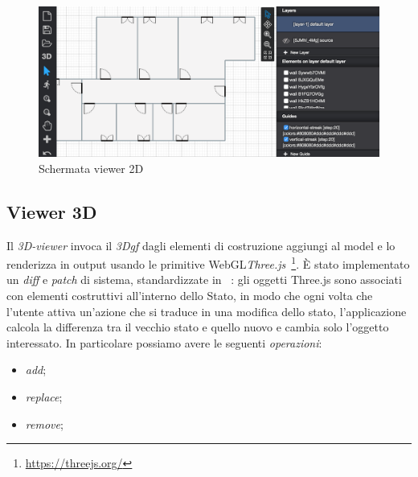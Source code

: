 
\begin{figure}[htbp] %
   \centering
   \includegraphics[width=1\linewidth]{images/2d}
   \caption{Schermata viewer 2D}
   \label{fig:view2D}
\end{figure}
\newpage


\subsection{Viewer 3D}
Il \emph{3D-viewer} invoca il \emph{3Dgf} dagli elementi di costruzione aggiungi al model e lo renderizza in output usando
le primitive WebGL\emph{Three.js}~\footnote{\url{https://threejs.org/}}. \`E stato implementato un \emph{diff} e \emph{patch} di
sistema, standardizzate in ~\cite{rfc6902}: gli oggetti Three.js sono associati con elementi costruttivi all'interno
dello Stato, in modo che ogni volta che l'utente attiva un'azione che si traduce in una modifica dello stato,
l'applicazione calcola la differenza tra il vecchio stato e quello nuovo e cambia solo l'oggetto interessato.
In particolare possiamo avere le seguenti \textit{operazioni}:
\begin{itemize}
  \item \emph{add};
  \item \emph{replace};
  \item \emph{remove};
\end{itemize}

